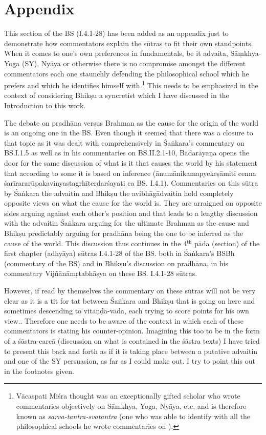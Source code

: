 \chapter*{Appendix}\label{appendix}
\setcounter{footnote}{0}

This section of the BS (I.4.1-28) has been added as an appendix just to demonstrate how commentators explain the sūtras to fit their own standpoints. When it comes to one’s own preferences in fundamentals, be it advaita, Sāṃkhya- Yoga (SY), Nyāya or otherwise there is no compromise amongst the different commentators each one staunchly defending the philosophical school which he prefers and which he identifies himself with.\footnote{Vācaspati Miśra thought was an exceptionally gifted scholar who wrote commentaries objectively on Sāmkhya, Yoga, Nyāya,  etc, and is therefore known as \textit{sarva-tantra-svatantra} (one  who was able to identify with all  the philosophical schools he wrote commentaries on ). } This needs to be emphasized in the context of considering Bhikṣu a syncretist which I have discussed in the Introduction to this work. 

The debate on pradhāna versus Brahman as the cause for the origin of the world is an ongoing one in the BS. Even though it seemed that there was a closure to that topic as it was dealt with comprehensively in  Śaṅkara’s commentary on BS.I.1.5 as well as in his commentaries on BS.II.2.1-10,  Bādarāyaṇa opens the door for the same discussion of what is it that causes the world  by his statement that according to some it is based on inference (ānumānikamapyekeṣāmiti cenna śarīrararūpakavinyastagṛhīterdarśayati ca BS. I.4.1). Commentaries on this sūtra by Śaṅkara the advaitin and Bhikṣu the avibhāgādvaitin hold completely opposite views on what the cause for the world is. They are arraigned on opposite sides arguing against each other’s position and that  leads to a lengthy discussion with the advaitin Śaṅkara arguing for the ultimate Brahman as the cause and Bhikṣu predictably arguing for pradhāna being the one to be inferred as the cause of the world. This discussion thus continues in the 4$^{\text{th}}$ pāda (section) of the first chapter (adhyāya) sūtras I.4.1-28 of the BS. both in Śaṅkara’s BSBh (commentary of the BS) and in Bhikṣu’s discussion on pradhāna, in his commentary Vijñānāmṛtabhāṣya on these BS. I.4.1-28 sūtras. 

However, if read by themselves the commentary on these sūtras will not be very clear as it is a tit for tat between Śaṅkara and Bhikṣu that is going on here and sometimes descending to vitaṇḍa-vāda, each trying to score points for his own view.. Therefore one needs to be aware of the context in which each of these commentators is stating his counter-opinion. Imagining this too to be in the form of a śāstra-carcā (discussion on what is contained in the śāstra texts) I have tried to present this back and forth as if it is taking place between a  putative advaitin and one of the SY persuasion, as far as I could make out. I try to point this out in the footnotes given.

